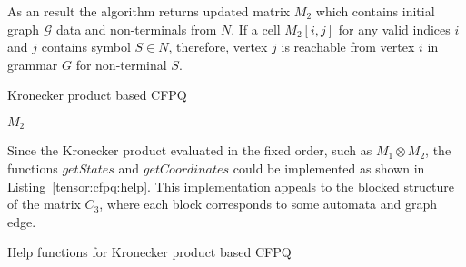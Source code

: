 As an result the algorithm returns updated matrix $M_2$ which contains initial graph $\mathcal{G}$ data and non-terminals from $N$. If a cell $M_2[i,j]$ for any valid indices $i$ and $j$ contains symbol $S \in N$, therefore, vertex $j$ is reachable from vertex $i$ in grammar $G$ for non-terminal $S$.

\begin{algorithm}[h]
\begin{algorithmic}[1]
\caption{Kronecker product based CFPQ}
\label{tensor:cfpq}
        \EndFor
    \EndFor
                    \EndIf
                \EndIf
           \EndFor
        \EndFor
    \EndWhile
\State \Return $M_2$
\EndFunction
\end{algorithmic}
\end{algorithm}

Since the Kronecker product evaluated in the fixed order, such as $M_1 \otimes M_2$, the functions $getStates$ and $getCoordinates$ could be implemented as shown in Listing~\ref{tensor:cfpq:help}. This implementation appeals to the blocked structure of the matrix $C_3$, where each block corresponds to some automata and graph edge.

\begin{algorithm}[h]
\begin{algorithmic}[1]
\caption{Help functions for Kronecker product based CFPQ}
\label{tensor:cfpq:help}
    \State {}
\EndFunction
{}
    \State {}
\EndFunction
\end{algorithmic}
\end{algorithm}

